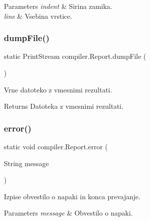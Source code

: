 \begin{DoxyParams}{Parameters}
{\em indent} & Sirina zamika. \\
\hline
{\em line} & Vsebina vrstice. \\
\hline
\end{DoxyParams}
\mbox{\label{classcompiler_1_1_report_aa10de6f639112a99db22127b061a930b}} 
\subsubsection{\texorpdfstring{dump\+File()}{dumpFile()}}
{\footnotesize\ttfamily static Print\+Stream compiler.\+Report.\+dump\+File (\begin{DoxyParamCaption}{ }\end{DoxyParamCaption})\hspace{0.3cm}{\ttfamily [static]}}

Vrne datoteko z vmesnimi rezultati.

\begin{DoxyReturn}{Returns}
Datoteka z vmesnimi rezultati. 
\end{DoxyReturn}
\mbox{\label{classcompiler_1_1_report_adb06e20323dbb6ec6ce2ebda5beea015}} 
\subsubsection{\texorpdfstring{error()}{error()}\hspace{0.1cm}{\footnotesize\ttfamily [1/3]}}
{\footnotesize\ttfamily static void compiler.\+Report.\+error (\begin{DoxyParamCaption}\item[{String}]{message }\end{DoxyParamCaption})\hspace{0.3cm}{\ttfamily [static]}}

Izpise obvestilo o napaki in konca prevajanje.


\begin{DoxyParams}{Parameters}
{\em message} & Obvestilo o napaki. \\
\hline
\end{DoxyParams}
\mbox{\label{classcompiler_1_1_report_aad79ddd080cb6ab9db966cc6abdb2948}} 
